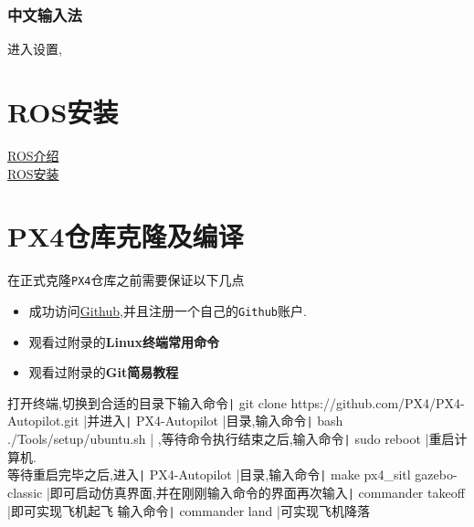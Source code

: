 \documentclass{article}
\newcommand\mintbash[1]{\texttt| #1 |}
\begin{document}
\subsubsection{中文输入法}
进入设置,
\section{ROS安装}

\href{URLhttps://wiki.ros.org/ROS/Introduction}{ROS介绍}
\\

\href{https://wiki.ros.org/noetic/Installation/Ubuntu}{ROS安装}

\section{PX4仓库克隆及编译}
在正式克隆\texttt{PX4}仓库之前需要保证以下几点
\begin{itemize}
    \item 成功访问\href{URLhttps://github.com/}{Github},并且注册一个自己的\texttt{Github}账户.
    \item 观看过附录的\textbf{Linux终端常用命令}
    \item 观看过附录的\textbf{Git简易教程}
\end{itemize}
打开终端,切换到合适的目录下输入命令\mintbash{git clone https://github.com/PX4/PX4-Autopilot.git}并进入\mintbash{ PX4-Autopilot }目录,输入命令\mintbash{bash ./Tools/setup/ubuntu.sh}
,等待命令执行结束之后,输入命令\mintbash{sudo reboot}重启计算机.
\\
等待重启完毕之后,进入\mintbash{PX4-Autopilot}目录,输入命令\mintbash{make px4_sitl gazebo-classic}即可启动仿真界面,并在刚刚输入命令的界面再次输入\mintbash{commander takeoff}即可实现飞机起飞
输入命令\mintbash{commander land}可实现飞机降落
\end{document}
